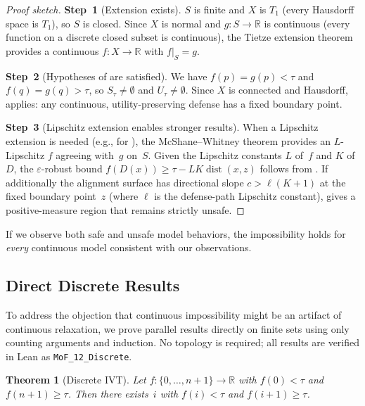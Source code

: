 \documentclass[11pt]{article}
\newtheorem{theorem}{Theorem}[section]
\newcommand{\R}{\mathbb{R}}
\newcommand{\dist}{\operatorname{dist}}
\begin{document}
\begin{proof}[Proof sketch]
\textbf{Step~1} (Extension exists).
$S$ is finite and $X$ is $T_1$ (every Hausdorff space is $T_1$), so
$S$ is closed. Since $X$ is normal and $g\colon S \to \R$ is
continuous (every function on a discrete closed subset is continuous),
the Tietze extension theorem provides a continuous
$f\colon X \to \R$ with $f|_S = g$.

\textbf{Step~2} (Hypotheses of  are satisfied).
We have $f(p) = g(p) < \tau$ and $f(q) = g(q) > \tau$, so
$S_\tau \neq \emptyset$ and $U_\tau \neq \emptyset$. Since $X$ is
connected and Hausdorff,  applies: any continuous,
utility-preserving defense has a fixed boundary point.

\textbf{Step~3} (Lipschitz extension enables stronger results).
When a Lipschitz extension is needed (e.g., for
), the McShane--Whitney theorem
provides an $L$-Lipschitz $f$ agreeing with~$g$ on~$S$. Given the
Lipschitz constants $L$ of~$f$ and $K$ of~$D$, the $\varepsilon$-robust
bound $f(D(x)) \geq \tau - LK\dist(x,z)$ follows from .
If additionally the alignment surface has directional slope
$c > \ell(K+1)$ at the fixed boundary point~$z$ (where $\ell$ is the
defense-path Lipschitz constant),  gives a
positive-measure region that remains strictly unsafe.
\end{proof}

If we observe both safe and unsafe model behaviors, the
impossibility holds for \emph{every} continuous model consistent with our observations.

\subsection{Direct Discrete Results}

To address the objection that continuous impossibility might be an
artifact of continuous relaxation, we prove parallel results directly
on finite sets using only counting arguments and induction. No
topology is required; all results are verified in Lean as
\texttt{MoF\_12\_Discrete}.

\begin{theorem}[Discrete IVT]
\label{thm:disc-ivt}
Let $f\colon \{0,\ldots,n+1\} \to \R$ with $f(0) < \tau$ and
$f(n+1) \geq \tau$. Then there exists~$i$ with $f(i) < \tau$ and
$f(i+1) \geq \tau$.
\end{theorem}
\end{document}
